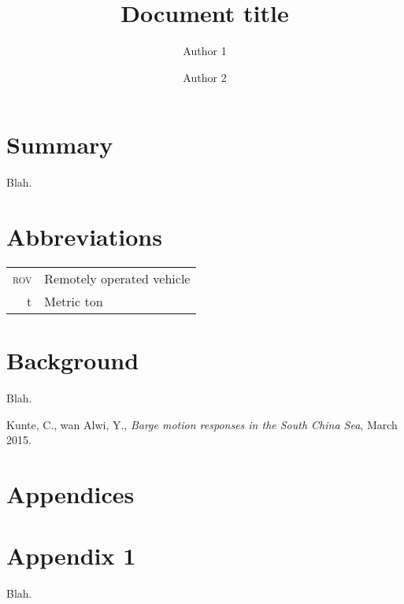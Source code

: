 \documentclass[12pt,a4paper]{article}
\title{Document title} %
\author{Author 1 \and Author 2} %
\begin{document}
	\maketitle

	\section*{Summary} %
	\label{sec:summary}
		
	Blah.
		

	\pagebreak

	\tableofcontents

	\listoftables

	\listoffigures

	\section*{Abbreviations} %
	\label{sec:abbr}
	\begin{tabular}{r l}
	     \textsc{rov} & Remotely operated vehicle \\
	                t & Metric ton \\
	\end{tabular}

	\section{Background} %
	\label{sec:bg}
	
	Blah.



	\begin{thebibliography}{9}
	        Kunte, C., wan Alwi, Y.,
	        \emph{Barge motion responses in the South China Sea}, 
	        March 2015.

	\end{thebibliography}

	\appendix
	\section*{Appendices}

	\section{Appendix 1} %
	\label{sec:app1}

	Blah.
	
\end{document}
